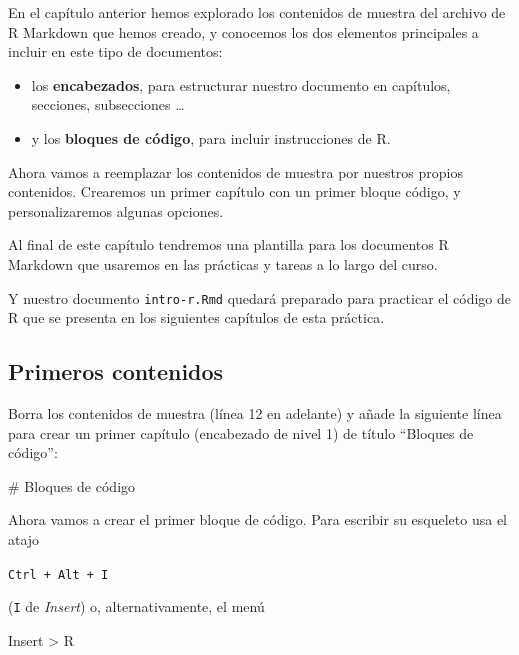 \documentclass[
  degree=mecinf,
  title=normal,
  toc=normal,
  bib=normal]{mnye}
\newenvironment{menu}{
    \begin{center}
    \sffamily\bfseries
}{
    \end{center}
}
\newenvironment{Shaded}{\begin{snugshade}}{\end{snugshade}}
\newcommand{\FunctionTok}[1]{\textcolor[rgb]{0.00,0.00,0.00}{#1}}
\begin{document}
En el capítulo anterior hemos explorado los contenidos de muestra del archivo de R Markdown que hemos creado, y conocemos los dos elementos principales a incluir en este tipo de documentos:

\begin{itemize}
\item
  los \textbf{encabezados}, para estructurar nuestro documento en capítulos, secciones, subsecciones \ldots{}
\item
  y los \textbf{bloques de código}, para incluir instrucciones de \textsf{R}.
\end{itemize}

Ahora vamos a reemplazar los contenidos de muestra por nuestros propios contenidos. Crearemos un primer capítulo con un primer bloque código, y personalizaremos algunas opciones.

Al final de este capítulo tendremos una plantilla para los documentos R Markdown que usaremos en las prácticas y tareas a lo largo del curso.

Y nuestro documento \texttt{intro-r.Rmd} quedará preparado para practicar el código de \textsf{R} que se presenta en los siguientes capítulos de esta práctica.

\hypertarget{primeros-contenidos}{%
\subsection{Primeros contenidos}\label{primeros-contenidos}}

Borra los contenidos de muestra (línea 12 en adelante) y añade la siguiente línea para crear un primer capítulo (encabezado de nivel 1) de título ``Bloques de código'':

\begin{Shaded}
\begin{Highlighting}[]
\FunctionTok{\# Bloques de código}
\end{Highlighting}
\end{Shaded}

Ahora vamos a crear el primer bloque de código. Para escribir su esqueleto usa el atajo

\begin{center}
\texttt{Ctrl\ +\ Alt\ +\ I}

\end{center}

(\texttt{I} de \emph{Insert}) o, alternativamente, el menú

\begin{menu}
Insert \textgreater{} R

\end{menu}
\end{document}
